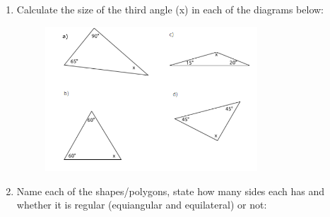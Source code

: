 \begin{enumerate}[noitemsep, label=\textbf{\arabic*}. ]
\begin{figure}[H]
\begin{center}
    \end{center}

 \end{figure}   

    \addtocounter{footnote}{-0}
    
        
\label{m39368*uid140}\item Calculate the size of the third angle (x) in each of the diagrams below:

          
    \setcounter{subfigure}{0}


	\begin{figure}[H] %
    \begin{center}
    \label{m39368*id401232!!!underscore!!!media}\label{m39368*id401232!!!underscore!!!printimage}\includegraphics[width=300px]{col11306.imgs/m39368_MG10C13_067.png} %
        
      \vspace{2pt}
    \vspace{.1in}
    
    \end{center}

 \end{figure}   

    \addtocounter{footnote}{-0}
    
        
\label{m39368*uid141}\item Name each of the shapes/polygons, state how many sides each has and whether it is regular (equiangular and equilateral) or not:

          
    \setcounter{subfigure}{0}



\end{enumerate}
